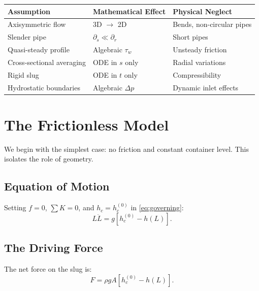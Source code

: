 \documentclass[11pt,a4paper]{article}
\theoremstyle{definition}
\begin{document}
\begin{center}
\renewcommand{\arraystretch}{1.2}
\begin{tabular}{lll}
\toprule
Assumption & Mathematical Effect & Physical Neglect \\
\midrule
Axisymmetric flow & 3D $\to$ 2D & Bends, non-circular pipes \\
Slender pipe & $\partial_s \ll \partial_r$ & Short pipes \\
Quasi-steady profile & Algebraic $\tau_w$ & Unsteady friction \\
Cross-sectional averaging & ODE in $s$ only & Radial variations \\
Rigid slug & ODE in $t$ only & Compressibility \\
Hydrostatic boundaries & Algebraic $\Delta p$ & Dynamic inlet effects \\
\bottomrule
\end{tabular}
\end{center}

\section{The Frictionless Model}
\label{sec:frictionless}

We begin with the simplest case: no friction and constant container level. This isolates the role of geometry.

\subsection{Equation of Motion}

Setting $f = 0$, $\sum K = 0$, and $h_c = h_c^{(0)}$ in \eqref{eq:governing}:
\begin{equation}
  L\ddot{L} = g[h_c^{(0)} - h(L)].
  \label{eq:frictionless-eom}
\end{equation}

\subsection{The Driving Force}

The net force on the slug is:
\begin{equation}
  F = \rho g A [h_c^{(0)} - h(L)].
  \label{eq:driving-force}
\end{equation}
\end{document}
